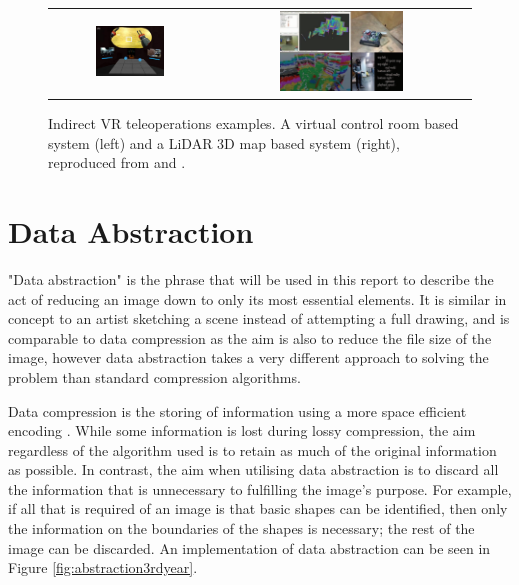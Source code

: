 \begin{figure}[H]
    \begin{center}
    \begin{tabular}{ c c }
        \includegraphics[width=0.45\textwidth]{Figures/homun.png} &
        \includegraphics[width=0.5\textwidth]{Figures/lidar.png}
    \end{tabular}
    \caption[Indirect VR teleoperations examples]{Indirect VR teleoperations examples. A virtual control room based system (left) and a LiDAR 3D map based system (right), reproduced from \cite{lipton2018baxter} and \cite{wang2017novel}.}
    \label{fig:VRTele}
    \end{center}
\end{figure}

\section{Data Abstraction}

"Data abstraction" is the phrase that will be used in this report to describe the act of reducing an image down to only its most essential elements. It is similar in concept to an artist sketching a scene instead of attempting a full drawing, and is comparable to data compression as the aim is also to reduce the file size of the image, however data abstraction takes a very different approach to solving the problem than standard compression algorithms.

Data compression is the storing of information using a more space efficient encoding \cite{compression}. While some information is lost during lossy compression, the aim regardless of the algorithm used is to retain as much of the original information as possible. In contrast, the aim when utilising data abstraction is to discard all the information that is unnecessary to fulfilling the image's purpose. For example, if all that is required of an image is that basic shapes can be identified, then only the information on the boundaries of the shapes is necessary; the rest of the image can be discarded. An implementation of data abstraction can be seen in Figure \ref{fig:abstraction3rdyear}.

